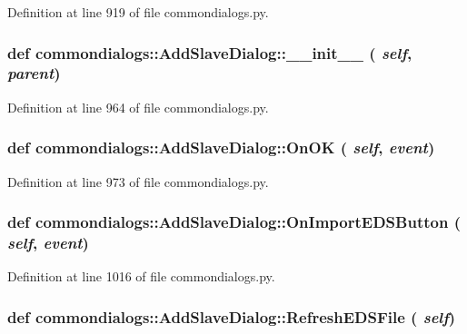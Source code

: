 Definition at line 919 of file commondialogs.py.\hypertarget{classcommondialogs_1_1AddSlaveDialog_b104177c85484b33a3ef22eab6e55268}{
\subsubsection[\_\-\_\-init\_\-\_\-]{\setlength{\rightskip}{0pt plus 5cm}def commondialogs::Add\-Slave\-Dialog::\_\-\_\-init\_\-\_\- ( {\em self},  {\em parent})}}
\label{classcommondialogs_1_1AddSlaveDialog_b104177c85484b33a3ef22eab6e55268}




Definition at line 964 of file commondialogs.py.\hypertarget{classcommondialogs_1_1AddSlaveDialog_d8788a0255709742043cb758b8e4093d}{
\subsubsection[OnOK]{\setlength{\rightskip}{0pt plus 5cm}def commondialogs::Add\-Slave\-Dialog::On\-OK ( {\em self},  {\em event})}}
\label{classcommondialogs_1_1AddSlaveDialog_d8788a0255709742043cb758b8e4093d}




Definition at line 973 of file commondialogs.py.\hypertarget{classcommondialogs_1_1AddSlaveDialog_c5d8179971eff35728972924949a4423}{
\subsubsection[OnImportEDSButton]{\setlength{\rightskip}{0pt plus 5cm}def commondialogs::Add\-Slave\-Dialog::On\-Import\-EDSButton ( {\em self},  {\em event})}}
\label{classcommondialogs_1_1AddSlaveDialog_c5d8179971eff35728972924949a4423}




Definition at line 1016 of file commondialogs.py.\hypertarget{classcommondialogs_1_1AddSlaveDialog_7db65b205229e136495f5e98f16aef72}{
\subsubsection[RefreshEDSFile]{\setlength{\rightskip}{0pt plus 5cm}def commondialogs::Add\-Slave\-Dialog::Refresh\-EDSFile ( {\em self})}}
\label{classcommondialogs_1_1AddSlaveDialog_7db65b205229e136495f5e98f16aef72}




